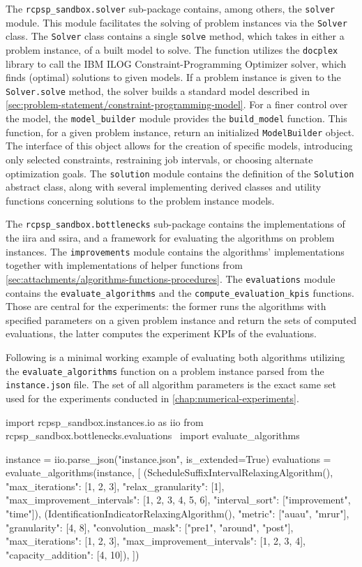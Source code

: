 The \texttt{rcpsp\_sandbox.solver} sub-package contains, among others, the \texttt{solver} module.
This module facilitates the solving of problem instances via the \texttt{Solver} class.
The \texttt{Solver} class contains a single \texttt{solve} method, which takes in either a problem instance,
of a built model to solve.
The function utilizes the \texttt{docplex} library to call the IBM ILOG Constraint-Programming Optimizer
solver, which finds (optimal) solutions to given models.
If a problem instance is given to the \texttt{Solver.solve} method,
the solver builds a standard model described in \cref{sec:problem-statement/constraint-programming-model}.
For a finer control over the model, the \texttt{model\_builder} module provides the \texttt{build\_model} function.
This function, for a given problem instance, return an initialized \texttt{ModelBuilder} object.
The interface of this object allows for the creation of specific models,
introducing only selected constraints, restraining job intervals, or choosing alternate optimization goals.
The \texttt{solution} module contains the definition of the \texttt{Solution} abstract class,
along with several implementing derived classes and utility functions concerning solutions to the problem instance models.

The \texttt{rcpsp\_sandbox.bottlenecks} sub-package contains the implementations of the \acl{iira} and \acl{ssira},
and a framework for evaluating the algorithms on problem instances.
The \texttt{improvements} module contains the algorithms' implementations
together with implementations of helper functions from \cref{sec:attachments/algorithms-functions-procedures}.
The \texttt{evaluations} module contains the \texttt{evaluate\_algorithms} and the \texttt{compute\_evaluation\_kpis} functions.
Those are central for the experiments: the former runs the algorithms with specified parameters on a given problem instance
and return the sets of computed evaluations, the latter computes the experiment KPIs of the evaluations.

Following is a minimal working example of evaluating both algorithms utilizing the \texttt{evaluate\_algorithms} function
on a problem instance parsed from the \texttt{instance.json} file.
The set of all algorithm parameters is the exact same set used for the experiments conducted in \cref{chap:numerical-experiments}.

\begin{python}
import rcpsp_sandbox.instances.io as iio
from rcpsp_sandbox.bottlenecks.evaluations \
    import evaluate_algorithms

instance = iio.parse_json("instance.json", is_extended=True)
evaluations = evaluate_algorithms(instance, [
    (ScheduleSuffixIntervalRelaxingAlgorithm(), {
        "max_iterations": [1, 2, 3],
        "relax_granularity": [1],
        "max_improvement_intervals": [1, 2, 3, 4, 5, 6],
        "interval_sort": ["improvement", "time"]}),
    (IdentificationIndicatorRelaxingAlgorithm(), {
        "metric": ["auau", "mrur"],
        "granularity": [4, 8],
        "convolution_mask": ["pre1", "around", "post"],
        "max_iterations": [1, 2, 3],
        "max_improvement_intervals": [1, 2, 3, 4],
        "capacity_addition": [4, 10]}),
])
\end{python}

